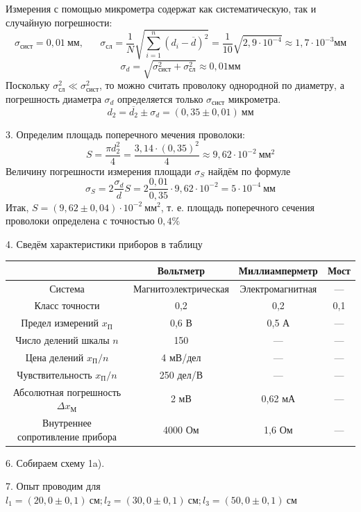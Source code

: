 \documentclass[a4paper, 12pt]{article}
\begin{document}
		Измерения с помощью микрометра содержат как систематическую, так и случайную погрешности:
		$$\sigma_{сист}=0,01\: мм,\;\;\;\;\;\; \sigma_{сл}=\frac{1}{N} \sqrt{\sum_{i=1}^{n}(d_i - \overline{d})^2}=\frac{1}{10} \sqrt{2,9\cdot 10^{-4}}\approx 1,7\cdot 10^{-3} мм$$
		$$\sigma_d = \sqrt{\sigma_{сист}^2+\sigma_{сл}^2}\approx 0,01 мм$$
		Поскольку $\sigma_{сл}^2 \ll \sigma_{сист}^2$, то можно считать проволоку однородной по диаметру, а погрешность диаметра $\sigma_d$ определяется только $\sigma_{сист}$ микрометра.
		$$d_2=\overline{d_2} \pm \sigma_d = (0,35 \pm 0,01)\: мм$$
		\par
		3. Определим площадь поперечного мечения проволоки:
		$$S = \frac{\pi d_2^2}{4}=\frac{3,14\cdot(0,35)^2}{4}\approx 9,62\cdot 10^{-2}\:  мм^2$$
		Величину погрешности измерения площади $\sigma_S$ найдём по формуле
		$$\sigma_S=2\frac{\sigma_d}{d}S=2\frac{0,01}{0,35}\cdot 9,62\cdot 10^{-2}=5\cdot 10^{-4}\: мм$$
		Итак, $S=(9,62 \pm 0,04)\cdot 10^{-2}\: мм^{2}$, т. е. площадь поперечного сечения проволоки определена с точностью $0,4\%$
		\par
		4. Сведём характеристики приборов в таблицу
		\begin{longtable}[H]{|c|c|c|c|}
			\hline
			& Вольтметр & Миллиамперметр & Мост \\
			\hline
			Система & Магнитоэлектрическая & Электромагнитная & --- \\
			Класс точности & 0,2 & 0,2 & 0,1 \\
			Предел измерений $x_П$ & 0,6 В & 0,5 А & --- \\
			Число делений шкалы $n$ & 150 & --- & --- \\
			Цена делений $x_П/n$ & 4 мВ/дел & --- & --- \\
			Чувствительность $x_П/n$ & 250 дел/В & --- & --- \\
			Абсолютная погрешность $\Delta x_М$ & 2 мВ & 0,62 мА & --- \\
			Внутреннее сопротивление прибора & 4000 Ом & 1,6 Ом & --- \\
			\hline
		\end{longtable}
		\par
		6. Собираем схему 1a).
		\par
		7. Опыт проводим для $l_1=(20,0 \pm 0,1)\: см; l_2=(30,0 \pm 0,1)\: см; l_3=(50,0 \pm 0,1)\: см$
		
\end{document}
